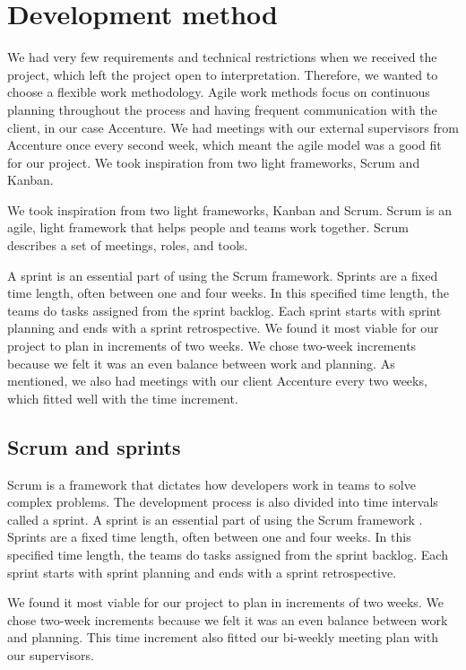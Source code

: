 \section{Development method}
We had very few requirements and technical restrictions when we received the project, which left the project open to interpretation. Therefore, we wanted to choose a flexible work methodology. Agile work methods focus on continuous planning throughout the process and having frequent communication with the client, in our case Accenture. We had meetings with our external supervisors from Accenture once every second week, which meant the agile model was a good fit for our project. We took inspiration from two light frameworks, Scrum and Kanban.

We took inspiration from two light frameworks, Kanban and Scrum. Scrum is an agile,  light framework that helps people and teams work together. Scrum describes a set of meetings, roles, and tools. 

A sprint is an essential part of using the Scrum framework. Sprints are a fixed time length, often between one and four weeks. In this specified time length, the teams do tasks assigned from the sprint backlog. Each sprint starts with sprint planning and ends with a sprint retrospective. We found it most viable for our project to plan in increments of two weeks. We chose two-week increments because we felt it was an even balance between work and planning. As mentioned, we also had meetings with our client Accenture every two weeks, which fitted well with the time increment.   

\subsection{Scrum and sprints}\label{section:scrum}
Scrum is a framework that dictates how developers work in teams to solve complex problems. The development process is also divided into time intervals called a sprint. A sprint is an essential part of using the Scrum framework \parencite{prosjektveilederen}. Sprints are a fixed time length, often between one and four weeks. In this specified time length, the teams do tasks assigned from the sprint backlog. Each sprint starts with sprint planning and ends with a sprint retrospective.

We found it most viable for our project to plan in increments of two weeks. We chose two-week increments because we felt it was an even balance between work and planning. This time increment also fitted our bi-weekly meeting plan with our supervisors.


